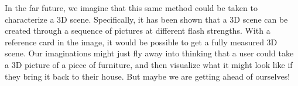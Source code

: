 \documentclass[10pt,twocolumn,letterpaper]{article}
\begin{document}
In the far future, we imagine that this same method could be taken to characterize a 3D scene. Specifically, it has been shown that a 3D scene can be created through a sequence of pictures at different flash strengths. With a reference card in the image, it would be possible to get a fully measured 3D scene. Our imaginations might just fly away into thinking that a user could take a 3D picture of a piece of furniture, and then visualize what it might look like if they bring it back to their house. But maybe we are getting ahead of ourselves!





{\small


}
\end{document}
